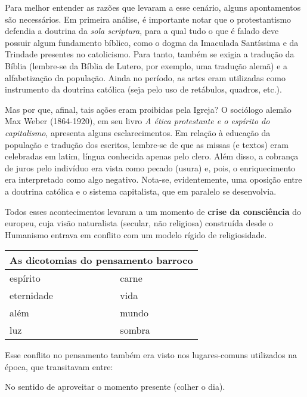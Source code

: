 Para melhor entender as razões que levaram a esse cenário, alguns apontamentos são necessários. Em primeira análise, é importante notar que o protestantismo defendia a doutrina da \textit{sola scriptura}, para a qual tudo o que é falado deve possuir algum fundamento bíblico, como o dogma da Imaculada Santíssima e da Trindade presentes no catolicismo. Para tanto, também se exigia a tradução da Bíblia (lembre-se da Bíblia de Lutero, por exemplo, uma tradução alemã) e a alfabetização da população. Ainda no período, as artes eram utilizadas como instrumento da doutrina católica (seja pelo uso de retábulos, quadros, etc.). 

Mas por que, afinal, tais ações eram proibidas pela Igreja? O sociólogo alemão Max Weber (1864-1920), em seu livro \textit{A ética protestante e o espírito do capitalismo}, apresenta alguns esclarecimentos. Em relação à educação da população e tradução dos escritos, lembre-se de que as missas (e textos) eram celebradas em latim, língua conhecida apenas pelo clero. Além disso, a cobrança de juros pelo indivíduo era vista como pecado (usura)  e, pois, o enriquecimento era interpretado como algo negativo. Nota-se, evidentemente, uma oposição entre a doutrina católica e o sistema capitalista, que em paralelo se desenvolvia.

Todos esses acontecimentos levaram a um momento de \textbf{crise da consciência} do europeu, cuja visão naturalista (secular, não religiosa) construída desde o Humanismo entrava em conflito com um modelo rígido de religiosidade.

\begin{table}[h]
\centering
\begin{tabular}{l l}
\toprule
\multicolumn{2}{c}{\textbf{As dicotomias do pensamento barroco}} \\
\midrule
espírito & carne \\
eternidade & vida \\
além & mundo \\
luz & sombra \\
\bottomrule
\end{tabular}
\end{table}

Esse conflito no pensamento também era visto nos lugares-comuns utilizados na época, que transitavam entre:

\begin{theorem}
No sentido de aproveitar o momento presente (colher o dia).
\end{theorem}

